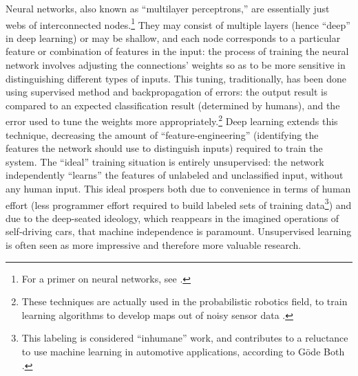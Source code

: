 Neural networks, also known as
``multilayer perceptrons,'' are essentially just webs of interconnected
nodes.\footnote{For a primer on neural 
  networks, see \cite{neuralJordan}.} They may consist of multiple layers
(hence ``deep'' in deep learning) or may be shallow, and each node
corresponds to a particular feature or combination of features in the
input: the process of training the
neural network involves adjusting the connections' weights so as to
be more sensitive in distinguishing different types of
inputs. This tuning,
traditionally, has been done using supervised method and
backpropagation of errors: the output result is compared to an
expected classification result (determined by humans), and the error used to tune the weights
more appropriately.\footnote{These techniques are actually used in the
probabilistic robotics field, to train learning algorithms to develop
maps out of noisy sensor data \cite[p. 284-297]{thrunProb}.} Deep
learning extends this technique, decreasing 
the amount of ``feature-engineering'' (identifying the
features the network should use to distinguish inputs) required to
train the system. The ``ideal'' training situation is entirely
unsupervised: the network independently ``learns'' the features of
unlabeled and unclassified input, without any human input. This ideal
prospers both due to convenience in terms of human effort (less
programmer effort required to build labeled sets of training
data\footnote{This labeling is considered ``inhumane'' work, and contributes to
a reluctance to use machine learning in automotive applications,
according to G\"{o}de Both \cite{bothpt2}.}) and
due to the deep-seated ideology, which reappears in the imagined
operations of self-driving cars, that machine independence is
paramount. Unsupervised learning is often seen as more impressive and
therefore more valuable research.



